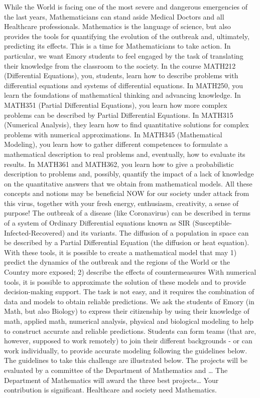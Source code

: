 \newpage
While the World is facing one of the most severe and dangerous emergencies of the last years, Mathematicians can stand aside Medical Doctors and all Healthcare professionals. Mathematics is the language of science, but also provides the tools for quantifying the evolution of the outbreak and, ultimately, predicting its effects. This is a time for Mathematicians to take action. In particular, we want Emory students to feel engaged by the task of translating their knowledge from the classroom to the society. 
In the course MATH212 (Differential Equations), you, students, learn how to describe problems with differential equations and systems of differential equations. In MATH250, you learn the foundations of mathematical thinking and advancing knowledge. In MATH351 (Partial Differential Equations), you learn how more complex problems can be described by Partial Differential Equations. In MATH315 (Numerical Analysis), they learn how to find quantitative solutions for complex problems with numerical approximations. In MATH345 (Mathematical Modeling), you learn how to gather different competences to formulate a mathematical description to real problems and, eventually, how to evaluate its results. In MATH361 and MATH362, you learn how to give a probabilistic description to problems and, possibly, quantify the impact of a lack of knowledge on the quantitative answers that we obtain from mathematical models.
All these concepts and notions may be beneficial NOW for our society under attack from this virus, together with your fresh energy, enthusiasm, creativity, a sense of purpose!
The outbreak of a disease (like Coronavirus) can be described in terms of a system of Ordinary Differential equations known as SIR (Susceptible-Infected-Recovered) and its variants. The diffusion of a population in space can be described by a Partial Differential Equation (the diffusion or heat equation). With these tools, it is possible to create a mathematical model that may
1) predict the dynamics of the outbreak and the regions of the World or the Country more exposed;
2) describe the effects of countermeasures
With numerical tools, it is possible to approximate the solution of these models and to provide decision-making support.
The task is not easy, and it requires the combination of data and models to obtain reliable predictions. We ask the students of Emory (in Math, but also Biology) to express their citizenship by using their knowledge of math, applied math, numerical analysis, physical and biological modeling to help to construct accurate and reliable predictions. 
Students can form teams (that are, however, supposed to work remotely) to join their different backgrounds - or can work individually, to provide accurate modeling following the guidelines below.
The guidelines to take this challenge are illustrated below.
The projects will be evaluated by a committee of the Department of Mathematics and …
The Department of Mathematics will award the three best projects…
Your contribution is significant. Healthcare and society need Mathematics.



